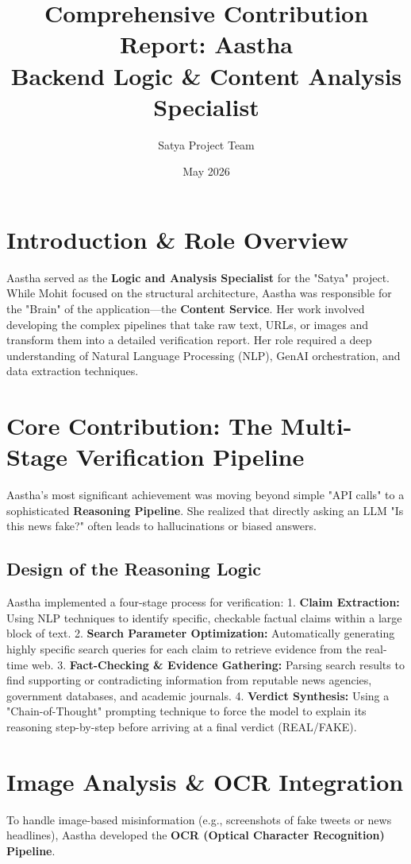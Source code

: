 \documentclass[12pt]{article}
\title{\textbf{Comprehensive Contribution Report: Aastha \\ Backend Logic \& Content Analysis Specialist}}
\author{Satya Project Team}
\date{May 2026}
\begin{document}
\maketitle

\section{Introduction \& Role Overview}
Aastha served as the \textbf{Logic and Analysis Specialist} for the "Satya" project. While Mohit focused on the structural architecture, Aastha was responsible for the "Brain" of the application—the \textbf{Content Service}. Her work involved developing the complex pipelines that take raw text, URLs, or images and transform them into a detailed verification report. Her role required a deep understanding of Natural Language Processing (NLP), GenAI orchestration, and data extraction techniques.

\section{Core Contribution: The Multi-Stage Verification Pipeline}
Aastha's most significant achievement was moving beyond simple "API calls" to a sophisticated \textbf{Reasoning Pipeline}. She realized that directly asking an LLM "Is this news fake?" often leads to hallucinations or biased answers.

\subsection{Design of the Reasoning Logic}
Aastha implemented a four-stage process for verification:
1. \textbf{Claim Extraction:} Using NLP techniques to identify specific, checkable factual claims within a large block of text.
2. \textbf{Search Parameter Optimization:} Automatically generating highly specific search queries for each claim to retrieve evidence from the real-time web.
3. \textbf{Fact-Checking & Evidence Gathering:} Parsing search results to find supporting or contradicting information from reputable news agencies, government databases, and academic journals.
4. \textbf{Verdict Synthesis:} Using a "Chain-of-Thought" prompting technique to force the model to explain its reasoning step-by-step before arriving at a final verdict (REAL/FAKE).

\section{Image Analysis & OCR Integration}
To handle image-based misinformation (e.g., screenshots of fake tweets or news headlines), Aastha developed the \textbf{OCR (Optical Character Recognition) Pipeline}.
\end{document}
